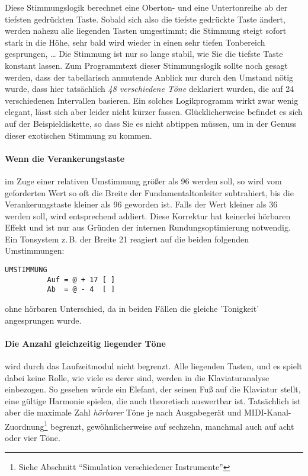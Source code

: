 Diese Stimmungslogik berechnet eine Oberton- und eine Untertonreihe ab
der tiefsten gedrückten Taste. Sobald sich also die tiefste gedrückte
Taste ändert, werden nahezu alle liegenden Tasten umgestimmt; die
Stimmung steigt sofort stark in die Höhe, sehr bald wird wieder in
einen sehr tiefen Tonbereich gesprungen, \dots{} Die Stimmung ist nur so
lange stabil, wie Sie die tiefste Taste konstant lassen.  Zum
Programmtext dieser Stimmungslogik sollte noch gesagt werden, dass der
tabellarisch anmutende Anblick nur durch den Umstand nötig wurde, dass
hier tatsächlich \emph{48 verschiedene Töne} deklariert wurden, die auf
24 verschiedenen Intervallen basieren. Ein solches Logikprogramm wirkt
zwar wenig elegant, lässt sich aber leider nicht kürzer fassen.
Glücklicherweise befindet es sich auf der Beispieldiskette, so dass Sie
es nicht abtippen müssen, um in der Genuss dieser exotischen Stimmung
zu kommen.

\paragraph{Wenn die Verankerungstaste} im Zuge einer relativen
Umstimmung größer als 96 werden soll, so wird vom geforderten Wert so
oft die Breite der Fundamentaltonleiter subtrahiert, bis die
Verankerungstaste kleiner als 96 geworden ist. Falls der Wert kleiner
als 36 werden soll, wird entsprechend addiert. Diese Korrektur hat
keinerlei hörbaren Effekt und ist nur aus Gründen der internen
Rundungsoptimierung notwendig. Ein Tonsystem z.\,B. der Breite 21
reagiert auf die beiden folgenden Umstimmungen:
\begin{verbatim}
UMSTIMMUNG
	      Auf = @ + 17 [ ]
	      Ab  = @ - 4  [ ]
\end{verbatim}
ohne hörbaren Unterschied, da in beiden Fällen die gleiche 'Tonigkeit'
angesprungen wurde.

\paragraph{Die Anzahl gleichzeitig liegender Töne} wird durch das
Laufzeitmodul nicht begrenzt. Alle liegenden Tasten, und es spielt
dabei keine Rolle, wie viele es derer sind, werden in die
Klaviaturanalyse einbezogen. So gesehen würde ein
Elefant, der seinen Fuß auf die Klaviatur stellt, eine 
gültige Harmonie spielen, die auch theoretisch auswertbar ist.
Tatsächlich ist aber die maximale Zahl \emph{hörbarer} Töne je nach
Ausgabegerät und MIDI-Kanal-Zuordnung\footnote{Siehe Abschnitt
"`Simulation verschiedener Instrumente"'} begrenzt, gewöhnlicherweise
auf sechzehn, manchmal auch auf acht oder vier Töne.

